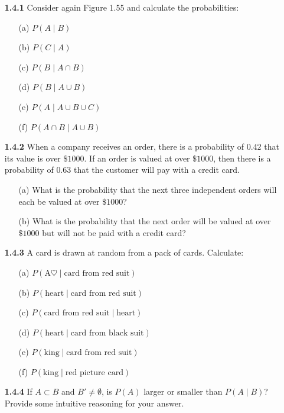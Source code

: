 \documentclass[10pt, twocolumn]{article}
\begin{document}
\begin{enumerate}
    \item[\textbf{1.4.1}] Consider again Figure 1.55 and calculate the probabilities:
    \begin{enumerate}
        \item[(a)] $P(A \mid B)$
        \item[(b)] $P(C \mid A)$
        \item[(c)] $P(B \mid A \cap B)$
        \item[(d)] $P(B \mid A \cup B)$
        \item[(e)] $P(A \mid A \cup B \cup C)$
        \item[(f)] $P(A \cap B \mid A \cup B)$
    \end{enumerate}

    \item[\textbf{1.4.2}] When a company receives an order, there is a probability of $0.42$ that its value is over $\$1000$. If an order is valued at over $\$1000$, then there is a probability of $0.63$ that the customer will pay with a credit card.
    \begin{enumerate}
        \item[(a)] What is the probability that the next three independent orders will each be valued at over $\$1000$?
        \item[(b)] What is the probability that the next order will be valued at over $\$1000$ but will not be paid with a credit card?
    \end{enumerate}

    \item[\textbf{1.4.3}] A card is drawn at random from a pack of cards. Calculate:
    \begin{enumerate}
        \item[(a)] $P(\text{A}\heartsuit \mid \text{card from red suit})$
        \item[(b)] $P(\text{heart} \mid \text{card from red suit})$
        \item[(c)] $P(\text{card from red suit} \mid \text{heart})$
        \item[(d)] $P(\text{heart} \mid \text{card from black suit})$
        \item[(e)] $P(\text{king} \mid \text{card from red suit})$
        \item[(f)] $P(\text{king} \mid \text{red picture card})$
    \end{enumerate}

    \item[\textbf{1.4.4}] If $A \subset B$ and $B' \neq \emptyset$, is $P(A)$ larger or smaller than $P(A \mid B)$? Provide some intuitive reasoning for your answer.


\end{enumerate}
\end{document}
